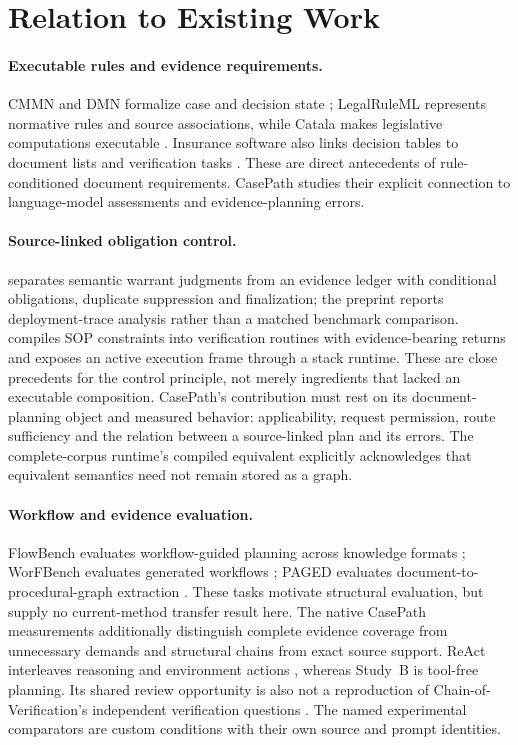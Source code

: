 \section{Relation to Existing Work}
\label{sec:related}

\paragraph{Executable rules and evidence requirements.}
CMMN and DMN formalize case and decision state
\citep{omg2016cmmn,omg2024dmn}; LegalRuleML represents normative rules and
source associations, while Catala makes legislative computations executable
\citep{oasis2021legalruleml,merigoux2021catala}. Insurance software also
links decision tables to document lists and verification tasks
\citep{servicenow2026documentlists}. These are direct antecedents of
rule-conditioned document requirements. CasePath studies their explicit
connection to language-model assessments and evidence-planning errors.

\paragraph{Source-linked obligation control.}
\citet{kim2026evidenceobligation} separates semantic warrant judgments from
an evidence ledger with conditional obligations, duplicate suppression and
finalization; the preprint reports deployment-trace analysis rather than a
matched benchmark comparison. \citet{yu2026compile} compiles SOP constraints
into verification routines with evidence-bearing returns and exposes an
active execution frame through a stack runtime. These are close precedents
for the control principle, not merely ingredients that lacked an executable
composition. CasePath's contribution must rest on its document-planning
object and measured behavior: applicability, request permission, route
sufficiency and the relation between a source-linked plan and its errors.
The complete-corpus runtime's compiled equivalent explicitly acknowledges
that equivalent semantics need not remain stored as a graph.

\paragraph{Workflow and evidence evaluation.}
FlowBench evaluates workflow-guided planning across knowledge formats
\citep{xiao2024flowbench}; WorFBench evaluates generated workflows
\citep{qiao2024worfbench}; PAGED evaluates document-to-procedural-graph
extraction \citep{du2024paged}. These tasks motivate structural evaluation,
but supply no current-method transfer result here. The native CasePath
measurements additionally distinguish complete evidence coverage from
unnecessary demands and structural chains from exact source support.
ReAct interleaves reasoning and environment actions \citep{yao2022react},
whereas Study~B is tool-free planning. Its shared review opportunity is
also not a reproduction of Chain-of-Verification's independent verification
questions \citep{dhuliawala2024chain}. The named experimental comparators
are custom conditions with their own source and prompt identities.

